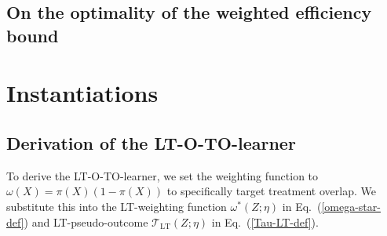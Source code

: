 \documentclass{article}
\theoremstyle{plain}
\theoremstyle{definition}
\theoremstyle{remark}
\newcommand{\1}{\mathds{1}}                %
\newcommand{\TO}{LT-O-TO-learner\xspace}
\begin{document}
\subsection{On the optimality of the weighted efficiency bound}






\section{Instantiations}

\subsection{Derivation of the \TO}
\label{app:TO-LT-learner}
To derive the \TO, we set the weighting function to $\omega(X) = \pi(X)(1-\pi(X))$ to specifically target treatment overlap. We substitute this into the LT-weighting function $\omega^*(Z;\eta)$ in Eq.~(\ref{omega-star-def}) and LT-pseudo-outcome $\mathcal{T}_\mathrm{LT}(Z;\eta)$ in Eq.~(\ref{Tau-LT-def}). 
\end{document}
